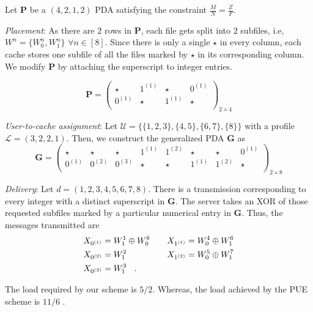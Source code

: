 \documentclass[conference,a4paper,10pt]{IEEEtran}
\begin{document}
\noindent Let $\mathbf{P}$ be a $(4,2,1,2)$ PDA satisfying the constraint $\frac{M}{N}=\frac{Z}{F}$. 

\textit{Placement}: As there are $2$ rows in $\mathbf{P}$, each file gets split into $2$ subfiles, i.e, $W^n =\{ W^n_0, W^n_1\}$ $\forall n \in [8].$ Since there is only a single $\star$ in every column, each cache stores one subfile of all the files marked by $\star$ in its corresponding column. We modify $\mathbf{P}$ by attaching the superscript to integer entries.

$$ \mathbf{P} =
\begin{pmatrix}
\star & 1^{(1)} & \star  & 0^{(1)} \\
0^{(1)} & \star  & 1^{(1)} & \star \\

\end{pmatrix}_{2 \times 4}$$

\textit{User-to-cache assignment}: Let $\mathcal{U}=\{\{1,2,3\}, \{4,5\}, \{6,7\},\{8\}\}$ with a profile $\mathcal{L}=(3,2,2,1)$. Then, we construct the generalized PDA $\mathbf{G}$ as 
$$  \mathbf{G} =
\begin{pmatrix}
\star & \star & \star & {1^{(1)}} & {1^{(2)}} & \star & \star & {0^{(1)}} \\
{0^{(1)}} & {0^{(2)}} & {0^{(3)}} & \star  & \star & {1^{(1)}} &{ 1^{(2)}} & \star \\

\end{pmatrix}_{2 \times 8}$$

\textit{Delivery}: Let $d=(1,2,3,4,5,6,7,8)$. There is a transmission corresponding to every integer with a distinct superscript in $\mathbf{G}$. The server takes an XOR of those requested subfiles marked by a particular numerical entry in $\mathbf{G}$.
Thus, the messages transmitted are
\begin{equation*}
\begin{aligned}
X_{0^{(1)}} & = W^1_{1} \oplus W^8_{0} & & &  X_{1^{(1)}} & = W^4_{0} \oplus W^6_{1} \\
X_{0^{(2)}} & = W^2_{1} & & & X_{1^{(2)}} & = W^5_{0} \oplus W^7_{1} \\
X_{0^{(3)}} & = W^3_{1}  \textrm{ \hspace{0.2cm}}. 
\end{aligned}
\end{equation*}

The load required by our scheme is ${5}/{2}$. Whereas, the load achieved by the PUE scheme is ${11}/{6}$ .
\end{document}

